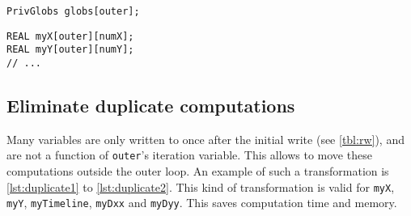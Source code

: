 \documentclass[a4paper]{article}
\begin{document}
\begin{lstlisting}[caption={An array of \texttt{PrivGlobs}.},label={lst:vector1}]
PrivGlobs globs[outer];
\end{lstlisting}
\begin{lstlisting}[caption={Expanding the struct.},label={lst:vector2}]
REAL myX[outer][numX];
REAL myY[outer][numY];
// ...
\end{lstlisting}

\subsection{Eliminate duplicate computations}
\label{sec:eliminate_dup_comp}

Many variables are only written to once after the initial write (see
\autoref{tbl:rw}), and are not a function of \texttt{outer}'s iteration
variable. This allows to move these computations outside the outer loop. An
example of such a transformation is \autoref{lst:duplicate1} to
\autoref{lst:duplicate2}. This kind of transformation is valid for
\texttt{myX}, \texttt{myY}, \texttt{myTimeline}, \texttt{myDxx} and
\texttt{myDyy}. This saves computation time and memory.
\end{document}
